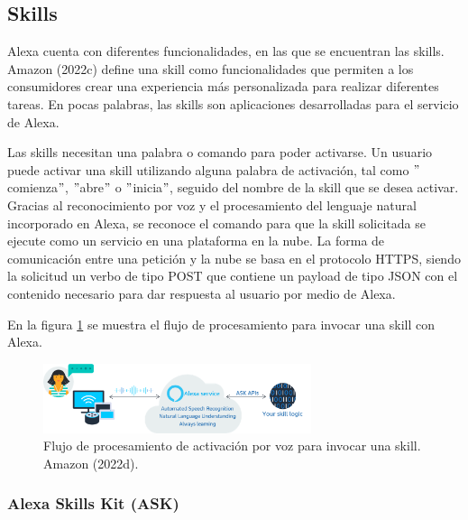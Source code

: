 
\subsection{Skills}
\label{SkillscapIV}

Alexa cuenta con diferentes funcionalidades, en las que se encuentran las skills. Amazon (2022c) define una skill como funcionalidades que permiten a los consumidores crear una experiencia más personalizada para realizar diferentes tareas. En pocas palabras, las skills son aplicaciones desarrolladas para el servicio de Alexa.

Las skills necesitan una palabra o comando para poder activarse. Un usuario puede activar una skill utilizando alguna palabra de activación, tal como $"$comienza$"$, $"$abre$"$ o $"$inicia$"$, seguido del nombre de la skill que se desea activar. Gracias al reconocimiento por voz y el procesamiento del lenguaje natural incorporado en Alexa, se reconoce el comando para que la skill solicitada se ejecute como un servicio en una plataforma en la nube. La forma de comunicación entre una petición y la nube se basa en el protocolo HTTPS, siendo la solicitud un verbo de tipo POST que contiene un payload de tipo JSON con el contenido necesario para dar respuesta al usuario por medio de Alexa.

En la figura \ref{fig:41} se muestra el flujo de procesamiento para invocar una skill con Alexa.

\begin{figure}
  \centering
  \includegraphics[width=0.70\textwidth]{Cap4/Figuras/ProcesoInvocacionSkill.png}
  \caption{Flujo de procesamiento de activación por voz para invocar una skill. Amazon (2022d).}
  \label{fig:41}
\end{figure}


\subsubsection{Alexa Skills Kit (ASK)}
\label{ASKcapIV}

